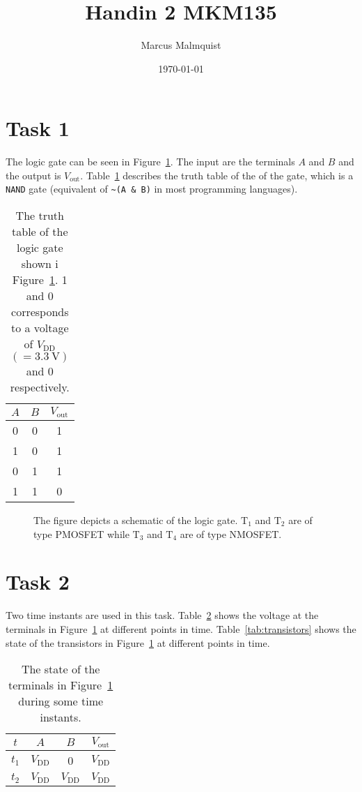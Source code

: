\documentclass[12pt,a4paper]{article}
\title{Handin 2 MKM135}
\author{Marcus Malmquist}
\date{\today}
\begin{document}
\maketitle
\section{Task 1}
The logic gate can be seen in Figure~\ref{fig:schematic}.
The input are the terminals $A$ and $B$ and the output is $V_{\text{out}}$.
Table~\ref{tab:logic} describes the truth table of the of the gate, which is a \texttt{NAND} gate (equivalent of \texttt{\textasciitilde(A \& B)} in most programming languages).
\begin{table}[!ht]
  \centering
  \caption{The truth table of the logic gate shown i Figure~\ref{fig:schematic}. 1 and 0 corresponds to a voltage of $V_{\text{DD}}$ $(=\SI{3.3}{\volt})$ and 0 respectively.}
  \begin{tabular}{|c|c|c|}\hline
    $A$ & $B$ & $V_{\text{out}}$ \\\hline
    0 & 0 & 1 \\\hline
    1 & 0 & 1 \\\hline
    0 & 1 & 1 \\\hline
    1 & 1 & 0 \\\hline
  \end{tabular}
  \label{tab:logic}
\end{table}

\begin{figure}[!ht]
  \centering
  \noindent\makebox[\textwidth]{\scalebox{1}{}}
  \caption{The figure depicts a schematic of the logic gate. $\text{T}_{1}$ and $\text{T}_{2}$ are of type PMOSFET while $\text{T}_{3}$ and $\text{T}_{4}$ are of type NMOSFET.}
  \label{fig:schematic}
\end{figure}

\section{Task 2}
Two time instants are used in this task.
Table~\ref{tab:terminals} shows the voltage at the terminals in Figure~\ref{fig:schematic} at different points in time.
Table~\ref{tab:transistors} shows the state of the transistors in Figure~\ref{fig:schematic} at different points in time.

\begin{table}[!ht]
  \centering
  \caption{The state of the terminals in Figure~\ref{fig:schematic} during some time instants.}
  \begin{tabular}{|c|c|c|c|}\hline
    $t$ & $A$ & $B$ & $V_{\text{out}}$ \\\hline
    $t_1$ & $V_{\text{DD}}$ & 0 & $V_{\text{DD}}$ \\\hline
    $t_2$ & $V_{\text{DD}}$ & $V_{\text{DD}}$ & $V_{\text{DD}}$ \\\hline
  \end{tabular}
  \label{tab:terminals}
\end{table}
\end{document}
